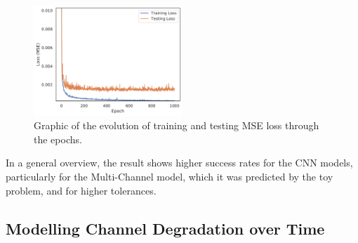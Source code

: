\documentclass{aa}
\begin{document}
\begin{figure}
    \centering
        \includegraphics[width=0.5\textwidth]{training_plot.pdf}
        \caption{Graphic of the evolution of training and testing MSE loss through the epochs.}
        \label{fig:training_curve}
\end{figure}

In a general overview, the result shows higher success rates for the CNN models, particularly for the Multi-Channel model, which it was predicted  by the toy problem, and for higher tolerances.

\subsection{Modelling Channel Degradation over Time}
    \label{sec:degradation}
    
\end{document}

